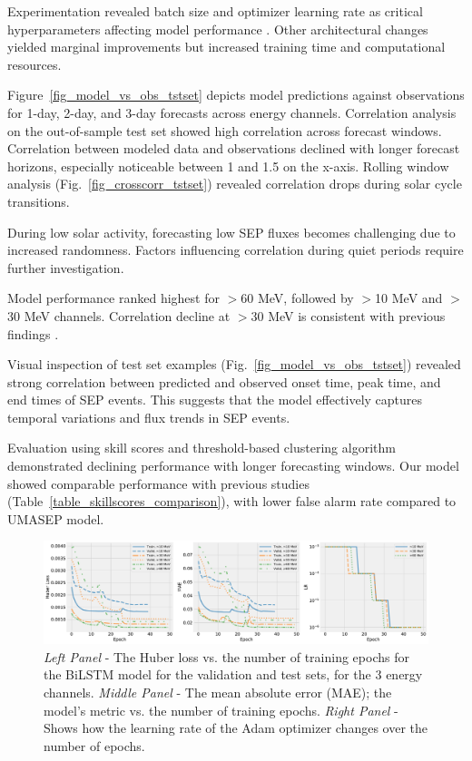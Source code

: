 Experimentation revealed batch size and optimizer learning rate as critical hyperparameters affecting model performance \citep{greff_2016}. Other architectural changes yielded marginal improvements but increased training time and computational resources.

Figure~\ref{fig_model_vs_obs_tstset} depicts model predictions against observations for 1-day, 2-day, and 3-day forecasts across energy channels. Correlation analysis on the out-of-sample test set showed high correlation across forecast windows.
Correlation between modeled data and observations declined with longer forecast horizons, especially noticeable between 1 and 1.5 on the x-axis. Rolling window analysis (Fig.~\ref{fig_crosscorr_tstset}) revealed correlation drops during solar cycle transitions.

During low solar activity, forecasting low SEP fluxes becomes challenging due to increased randomness. Factors influencing correlation during quiet periods require further investigation.

Model performance ranked highest for $>$60 MeV, followed by $>$10 MeV and $>$30 MeV channels. Correlation decline at $>$30 MeV is consistent with previous findings \citep{le_2017}.

Visual inspection of test set examples (Fig.~\ref{fig_model_vs_obs_tstset}) revealed strong correlation between predicted and observed onset time, peak time, and end times of SEP events. This suggests that the model effectively captures temporal variations and flux trends in SEP events.

Evaluation using skill scores and threshold-based clustering algorithm demonstrated declining performance with longer forecasting windows. Our model showed comparable performance with previous studies (Table~\ref{table_skillscores_comparison}), with lower false alarm rate compared to UMASEP model.

\begin{figure}[!htp]
	\centering
	\includegraphics[width=\textwidth]{chapter4/figs/loss_curve_allenergies.pdf}
	\caption{\textit{Left Panel} - The Huber loss vs. the number of training epochs for the BiLSTM model for the validation and test sets, for the 3 energy channels. \textit{Middle Panel} - The mean absolute error (MAE); the model's metric vs. the number of training epochs. \textit{Right Panel} - Shows how the learning rate of the Adam optimizer changes over the number of epochs.}
	\label{fig_lossCurve}
\end{figure}

